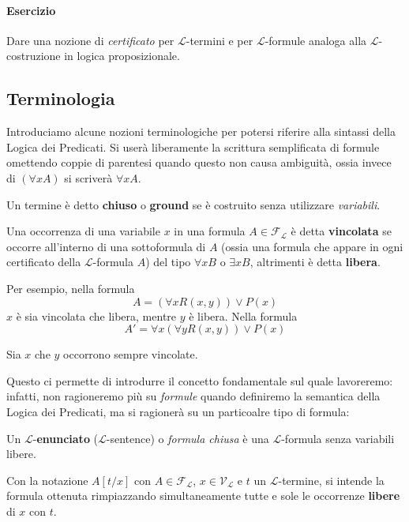 \paragraph{Esercizio} Dare una nozione di \textit{certificato} per 
$\mathscr{L}$-termini e per $\mathscr{L}$-formule analoga alla $\mathscr{L}$-costruzione in logica proposizionale. 

\subsection{Terminologia}
Introduciamo alcune nozioni terminologiche per potersi riferire alla sintassi 
della Logica dei Predicati.
Si userà liberamente la scrittura semplificata di formule omettendo coppie di parentesi
quando questo non causa ambiguità, ossia invece di $(\forall x A)$ si scriverà $\forall x A$.

\begin{defi}
Un termine è detto \textbf{chiuso} o \textbf{ground} se è costruito senza utilizzare \textit{variabili}. 
\end{defi}

\begin{defi}
Una occorrenza di una variabile $x$ in una formula $A \in \mathscr{F}_\mathscr{L}$ è detta \textbf{vincolata} se occorre all'interno di una sottoformula di $A$ (ossia una formula che appare in ogni certificato della $\mathscr{L}$-formula $A$) del tipo $\forall x B$ o $\exists x B$, altrimenti è detta \textbf{libera}.
\end{defi}

Per esempio, nella formula 
$$
A = (\forall x R(x,y)) \lor P(x)
$$
$x$ è sia vincolata che libera, mentre $y$ è libera. 
Nella formula 
$$
A' = \forall x (\forall y R(x,y)) \lor P(x)
$$

Sia $x$ che $y$ occorrono sempre vincolate. 

Questo ci permette di introdurre il concetto fondamentale sul quale lavoreremo: infatti, non ragioneremo più su \textit{formule} quando definiremo la semantica della Logica dei Predicati, ma si ragionerà su un particoalre tipo di formula: 
\begin{defi}
Un $\mathscr{L}$-\textbf{enunciato} ($\mathscr{L}$-sentence) o \textit{formula chiusa} è una $\mathscr{L}$-formula senza variabili libere.
\end{defi}

\begin{defi}[Sostituzione]
Con la notazione $A[t/x]$ con $A \in \mathscr{F}_\mathscr{L}$, $x \in \mathscr{V}_\mathscr{L}$ e $t$ un $\mathscr{L}$-termine, si intende la formula ottenuta rimpiazzando simultaneamente tutte e sole le occorrenze \textbf{libere} di $x$ con $t$. 
\end{defi}
